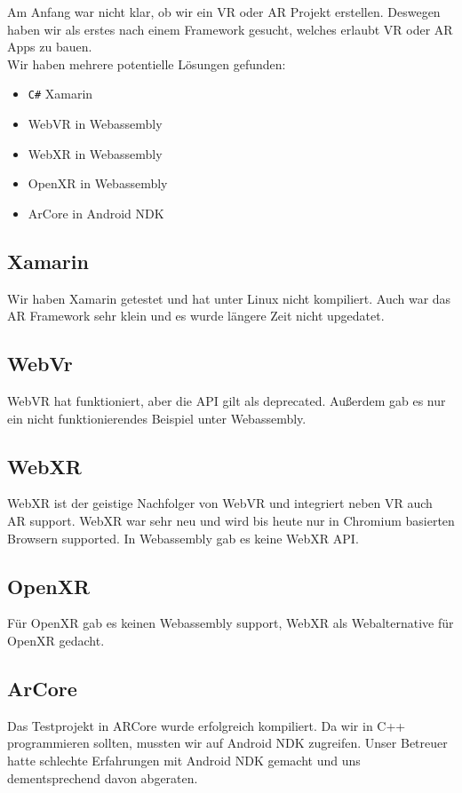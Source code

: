 Am Anfang war nicht klar, ob wir ein VR oder AR Projekt erstellen. Deswegen haben wir als erstes nach einem Framework gesucht, welches erlaubt VR oder AR Apps zu bauen.
\\
Wir haben mehrere potentielle Lösungen gefunden:

\begin{itemize}
  \item \verb|C#| Xamarin \cite{xamarin}
  \item WebVR in Webassembly \cite{webvr} \cite{webassembly}
  \item WebXR in Webassembly \cite{webxr} \cite{webassembly}
  \item OpenXR in Webassembly \cite{openxr_2016}
  \item ArCore in Android NDK \cite{ar_core}
\end{itemize}

\subsection{Xamarin}
Wir haben Xamarin\cite{xamarin} getestet und hat unter Linux nicht
kompiliert. Auch war das AR
Framework sehr klein und es wurde längere Zeit nicht upgedatet.

\subsection{WebVr}
WebVR\cite{webvr} hat funktioniert, aber die API gilt als deprecated.
Außerdem gab es nur ein nicht
funktionierendes Beispiel unter Webassembly.

\subsection{WebXR}
WebXR\cite{webxr} ist der geistige Nachfolger von WebVR und integriert neben VR auch AR support.
WebXR war sehr neu und wird bis heute nur in Chromium
basierten Browsern
supported. In Webassembly gab es keine WebXR API.

\subsection{OpenXR}
Für OpenXR\cite{openxr_2016} gab es keinen Webassembly support, WebXR als Webalternative für OpenXR gedacht.

\subsection{ArCore}
Das Testprojekt in ARCore\cite{ar_core_sdk} wurde erfolgreich kompiliert.
Da wir in C++ programmieren sollten, mussten wir auf Android NDK\cite{android_ndk} zugreifen.
Unser Betreuer hatte schlechte Erfahrungen mit Android NDK
gemacht und uns dementsprechend davon abgeraten.

